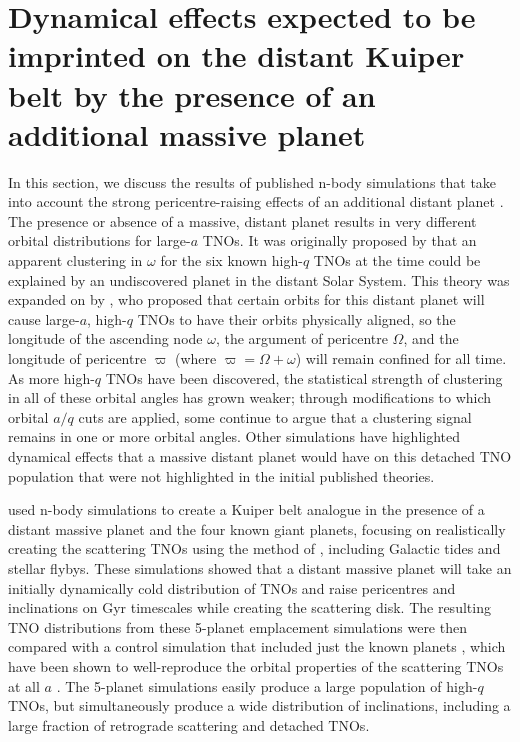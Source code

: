 \documentclass[preprint]{aastex62}
\begin{document}
\section{Dynamical effects expected to be imprinted on the distant Kuiper belt by the presence of an additional massive planet}

In this section, we discuss the results of published n-body simulations that take into account the strong pericentre-raising effects of an additional distant planet \citep[e.g.][]{lawler2017}.
The presence or absence of a massive, distant planet results in very different orbital distributions for large-$a$ TNOs.  
It was originally proposed by \citet{trujillosheppard14} that an apparent clustering in $\omega$ for the six known high-$q$ TNOs at the time could be explained by an undiscovered planet in the distant Solar System.
This theory was expanded on by \citet{batyginbrown16}, who proposed that certain orbits for this distant planet will cause large-$a$, high-$q$ TNOs to have their orbits physically aligned, so the longitude of the ascending node $\omega$, the argument of pericentre $\Omega$, and the longitude of pericentre $\varpi$ (where $\varpi=\Omega+\omega$) will remain confined for all time.
As more high-$q$ TNOs have been discovered, the statistical strength of clustering in all of these orbital angles has grown weaker; through modifications to which orbital $a/q$ cuts are applied, some continue to argue that a clustering signal remains in one or more orbital angles.
Other simulations have highlighted dynamical effects that a massive distant planet would have on this detached TNO population that were not highlighted in the initial published theories.


\citet{lawler2017} used n-body simulations to create a Kuiper belt analogue in the presence of a distant massive planet and the four known giant planets, focusing on realistically creating the scattering TNOs using the method of \citet{kaib11b}, including Galactic tides and stellar flybys.  
These simulations showed that a distant massive planet will take an initially dynamically cold distribution of TNOs and raise pericentres and inclinations on Gyr timescales while creating the scattering disk.
The resulting TNO distributions from these 5-planet emplacement simulations were then compared with a control simulation that included just the known planets \citep{kaib11b}, which have been shown to well-reproduce the orbital properties of the scattering TNOs at all $a$ \citep{shankman13,lawler2018scat}. 
The 5-planet simulations easily produce a large population of high-$q$ TNOs, but simultaneously produce a wide distribution of inclinations, including a large fraction of retrograde scattering and detached TNOs.
\end{document}

